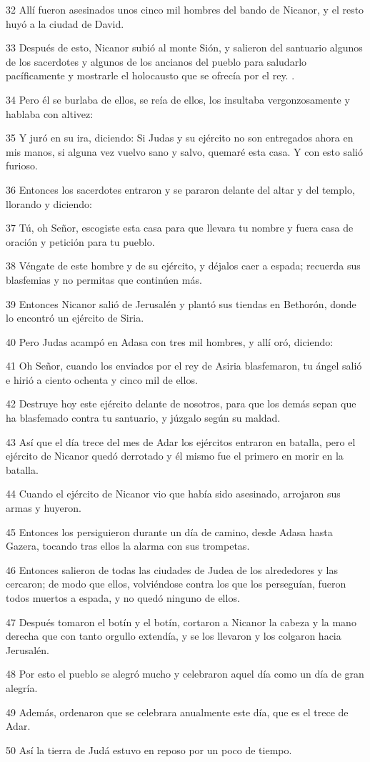 \par 32 Allí fueron asesinados unos cinco mil hombres del bando de Nicanor, y el resto huyó a la ciudad de David.
\par 33 Después de esto, Nicanor subió al monte Sión, y salieron del santuario algunos de los sacerdotes y algunos de los ancianos del pueblo para saludarlo pacíficamente y mostrarle el holocausto que se ofrecía por el rey. .
\par 34 Pero él se burlaba de ellos, se reía de ellos, los insultaba vergonzosamente y hablaba con altivez:
\par 35 Y juró en su ira, diciendo: Si Judas y su ejército no son entregados ahora en mis manos, si alguna vez vuelvo sano y salvo, quemaré esta casa. Y con esto salió furioso.
\par 36 Entonces los sacerdotes entraron y se pararon delante del altar y del templo, llorando y diciendo:
\par 37 Tú, oh Señor, escogiste esta casa para que llevara tu nombre y fuera casa de oración y petición para tu pueblo.
\par 38 Véngate de este hombre y de su ejército, y déjalos caer a espada; recuerda sus blasfemias y no permitas que continúen más.
\par 39 Entonces Nicanor salió de Jerusalén y plantó sus tiendas en Bethorón, donde lo encontró un ejército de Siria.
\par 40 Pero Judas acampó en Adasa con tres mil hombres, y allí oró, diciendo:
\par 41 Oh Señor, cuando los enviados por el rey de Asiria blasfemaron, tu ángel salió e hirió a ciento ochenta y cinco mil de ellos.
\par 42 Destruye hoy este ejército delante de nosotros, para que los demás sepan que ha blasfemado contra tu santuario, y júzgalo según su maldad.
\par 43 Así que el día trece del mes de Adar los ejércitos entraron en batalla, pero el ejército de Nicanor quedó derrotado y él mismo fue el primero en morir en la batalla.
\par 44 Cuando el ejército de Nicanor vio que había sido asesinado, arrojaron sus armas y huyeron.
\par 45 Entonces los persiguieron durante un día de camino, desde Adasa hasta Gazera, tocando tras ellos la alarma con sus trompetas.
\par 46 Entonces salieron de todas las ciudades de Judea de los alrededores y las cercaron; de modo que ellos, volviéndose contra los que los perseguían, fueron todos muertos a espada, y no quedó ninguno de ellos.
\par 47 Después tomaron el botín y el botín, cortaron a Nicanor la cabeza y la mano derecha que con tanto orgullo extendía, y se los llevaron y los colgaron hacia Jerusalén.
\par 48 Por esto el pueblo se alegró mucho y celebraron aquel día como un día de gran alegría.
\par 49 Además, ordenaron que se celebrara anualmente este día, que es el trece de Adar.
\par 50 Así la tierra de Judá estuvo en reposo por un poco de tiempo.

